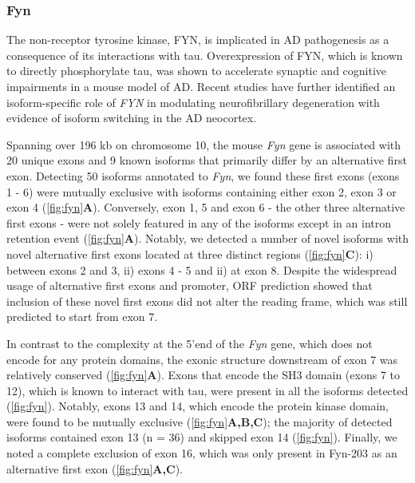 \newpage
\subsubsection{Fyn}
The non-receptor tyrosine kinase, FYN, is implicated in AD pathogenesis as a consequence of its interactions with tau\cite{Bhaskar2010}. Overexpression of FYN, which is known to directly phosphorylate tau\cite{Bhaskar2010}, was shown to accelerate synaptic and cognitive impairments in a mouse model of AD\cite{Chin2005}. Recent studies have further identified an isoform-specific role of \textit{FYN} in modulating neurofibrillary degeneration with evidence of isoform switching in the AD neocortex\cite{Lee2016b}. 

Spanning over 196 kb on chromosome 10, the mouse \textit{Fyn} gene is associated with 20 unique exons and 9 known isoforms that primarily differ by an alternative first exon. Detecting 50 isoforms annotated to \textit{Fyn}, we found these first exons (exons 1 - 6) were mutually exclusive with isoforms containing either exon 2, exon 3 or exon 4 (\cref{fig:fyn}\textbf{A}). Conversely, exon 1, 5 and exon 6 - the other three alternative first exons - were not solely featured in any of the isoforms except in an intron retention event (\cref{fig:fyn}\textbf{A}). Notably, we detected a number of novel isoforms with novel alternative first exons located at three distinct regions (\cref{fig:fyn}\textbf{C}): i) between exons 2 and 3, ii) exons 4 - 5 and ii) at exon 8. Despite the widespread usage of alternative first exons and promoter, ORF prediction showed that inclusion of these novel first exons did not alter the reading frame, which was still predicted to start from exon 7.  

In contrast to the complexity at the 5'end of the \textit{Fyn} gene, which does not encode for any protein domains, the exonic structure downstream of exon 7 was relatively conserved (\cref{fig:fyn}\textbf{A}). Exons that encode the SH3 domain (exons 7 to 12), which is known to interact with tau, were present in all the isoforms detected (\cref{fig:fyn}). Notably, exons 13 and 14, which encode the protein kinase domain, were found to be mutually exclusive (\cref{fig:fyn}\textbf{A,B,C}); the majority of detected isoforms contained exon 13 (n = 36) and skipped exon 14 (\cref{fig:fyn}). Finally, we noted a complete exclusion of exon 16, which was only present in Fyn-203 as an alternative first exon (\cref{fig:fyn}\textbf{A,C}). 

